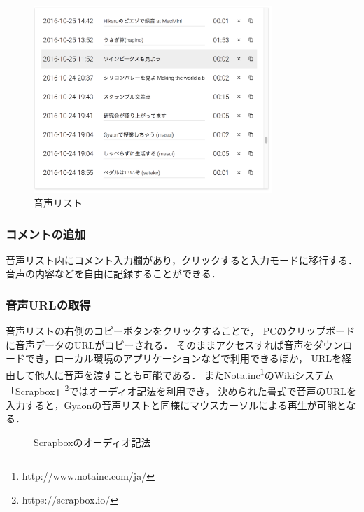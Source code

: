 \begin{figure}[H]
\centering
\includegraphics[width=9cm]{images/list.png}
\caption{音声リスト}
\label{list}
\end{figure}

\subsubsection{コメントの追加}
音声リスト内にコメント入力欄があり，クリックすると入力モードに移行する．
音声の内容などを自由に記録することができる．

\subsubsection{音声URLの取得}
音声リストの右側のコピーボタンをクリックすることで，
PCのクリップボードに音声データのURLがコピーされる．
そのままアクセスすれば音声をダウンロードでき，ローカル環境のアプリケーションなどで利用できるほか，
URLを経由して他人に音声を渡すことも可能である．
またNota.inc\footnote{\textsf{http://www.notainc.com/ja/}}のWikiシステム
「Scrapbox」\footnote{\textsf{https://scrapbox.io/}}ではオーディオ記法を利用でき，
決められた書式で音声のURLを入力すると，Gyaonの音声リストと同様にマウスカーソルによる再生が可能となる．

\begin{figure}[H]
\centering
{}
\caption{Scrapboxのオーディオ記法}
\label{scrapbox}
\end{figure}

